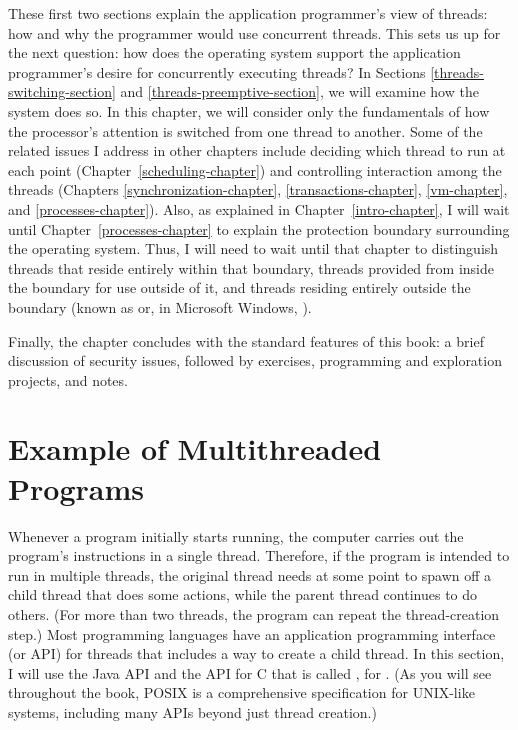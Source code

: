 These first two sections explain the application programmer's view of
threads: how and why the programmer would use concurrent threads.
This sets us up for the next question: how does the operating system
support the application programmer's desire for concurrently executing
threads?  In Sections \ref{threads-switching-section} and
\ref{threads-preemptive-section}, we will examine how the system does
so.  In this chapter, we will consider only the fundamentals of how
the processor's attention is switched from one thread to another.  Some
of the related issues I address in other chapters include deciding
which thread to run at each point (Chapter~\ref{scheduling-chapter})
and controlling interaction among the threads (Chapters
\ref{synchronization-chapter}, \ref{transactions-chapter},
\ref{vm-chapter}, and \ref{processes-chapter}).
Also, as explained in Chapter~\ref{intro-chapter}, I will wait until
Chapter~\ref{processes-chapter} to explain the protection boundary
surrounding the operating system.  Thus, I will need to wait until
that chapter to distinguish threads that reside entirely within that
boundary, threads provided from inside the boundary for use outside of
it, and threads residing entirely outside the boundary (known as
 or, in Microsoft Windows, ).

Finally, the chapter concludes with the standard features of this
book: a brief discussion of security issues, followed by exercises,
programming and exploration projects, and notes.

\section{Example of Multithreaded Programs}\label{threads-example-section}

Whenever a program initially starts running, the computer carries
out the program's instructions in a single thread. Therefore, if the program is intended
to run in multiple threads, the original thread needs at some point to
spawn off a child thread that does some actions, while the parent
thread continues to do others.  (For more than two threads, the
program can repeat the thread-creation step.)  Most programming
languages have an application programming interface (or API) for
threads that includes a way to create a child thread.  In this
section, I will use
the Java API and the API for C that is called , for
.  (As you will see throughout the book, POSIX is a
comprehensive specification for UNIX-like systems, including many APIs
beyond just thread creation.)

